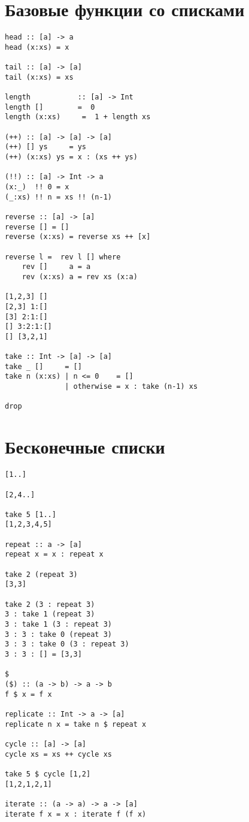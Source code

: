 \documentclass[a4paper,10pt]{article}
\begin{document}
\section{Базовые функции со списками}
\begin{lstlisting}
head :: [a] -> a
head (x:xs) = x

tail :: [a] -> [a]
tail (x:xs) = xs

length           :: [a] -> Int
length []        =  0
length (x:xs)     =  1 + length xs

(++) :: [a] -> [a] -> [a]
(++) [] ys     = ys
(++) (x:xs) ys = x : (xs ++ ys)

(!!) :: [a] -> Int -> a
(x:_)  !! 0 = x
(_:xs) !! n = xs !! (n-1)

reverse :: [a] -> [a]
reverse [] = []
reverse (x:xs) = reverse xs ++ [x]

reverse l =  rev l [] where
    rev []     a = a
    rev (x:xs) a = rev xs (x:a)

[1,2,3] []
[2,3] 1:[]
[3] 2:1:[]
[] 3:2:1:[]
[] [3,2,1]

take :: Int -> [a] -> [a]
take _ []     = []
take n (x:xs) | n <= 0    = []
              | otherwise = x : take (n-1) xs

drop

\end{lstlisting}

\section{Бесконечные списки}
\begin{lstlisting}
[1..]

[2,4..]

take 5 [1..]
[1,2,3,4,5]

repeat :: a -> [a]
repeat x = x : repeat x

take 2 (repeat 3)
[3,3]

take 2 (3 : repeat 3)
3 : take 1 (repeat 3)
3 : take 1 (3 : repeat 3)
3 : 3 : take 0 (repeat 3)
3 : 3 : take 0 (3 : repeat 3)
3 : 3 : [] = [3,3]

$
($) :: (a -> b) -> a -> b
f $ x = f x

replicate :: Int -> a -> [a]
replicate n x = take n $ repeat x

cycle :: [a] -> [a]
cycle xs = xs ++ cycle xs

take 5 $ cycle [1,2]
[1,2,1,2,1]

iterate :: (a -> a) -> a -> [a]
iterate f x = x : iterate f (f x)
\end{lstlisting}
\end{document}
